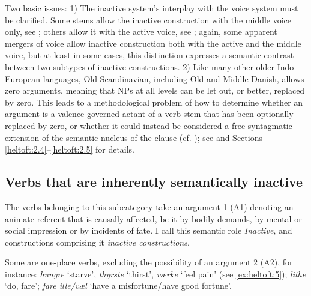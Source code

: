 \documentclass[output=paper]{langscibook}
\begin{document}
Two basic issues: 1) The inactive system's interplay with the voice system must be clarified. Some stems allow the inactive construction with the middle voice only, see ; others allow it with the active voice, see ; again, some apparent mergers of voice allow inactive construction both with the active and the middle voice, but at least in some cases, this distinction expresses a semantic contrast between two subtypes of inactive constructions. 2) Like many other older Indo-European languages, Old Scandinavian, including Old and Middle Danish, allows zero arguments, meaning that NPs at all levels can be let out, or better, replaced by zero. This leads to a methodological problem of how to determine whether an argument is a valence-governed actant of a verb stem that has been optionally replaced by zero, or whether it could instead be considered a free syntagmatic extension of the semantic nucleus of the clause (cf. \citealt{NielsenHeltoft2020}); see  and Sections \ref{heltoft:2.4}--\ref{heltoft:2.5} for details.

\subsection{Verbs that are inherently semantically inactive} \label{heltoft:2.1}

The verbs belonging to this subcategory take an argument 1 (A1) denoting an animate referent that is causally affected, be it by bodily demands, by mental or social impression or by incidents of fate. I call this semantic role \textit{Inactive}, and constructions comprising it \textit{inactive constructions}.  

Some are one-place verbs, excluding the possibility of an argument 2 (A2), for instance: \textit{hungre} ‘starve', \textit{thyrste} ‘thirst', \textit{værke} ‘feel pain' (see \ref{ex:heltoft:5}); \textit{lithe} ‘do, fare'; \textit{fare ille/væl} ‘have a misfortune/have good fortune'.
\end{document}
